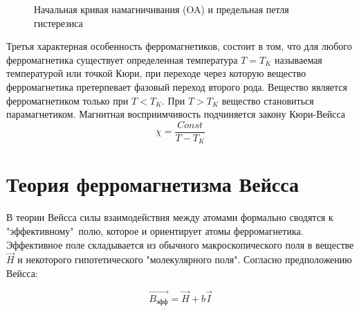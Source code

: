 \documentclass[a4paper,14pt]{article} %
\begin{document}
\begin{figure}[H]
	\caption{Начальная кривая намагничивания (OA) и предельная петля гистерезиса}
\end{figure}

Третья характерная особенность ферромагнетиков, состоит в том, что для любого ферромагнетика существует определенная температура $T = T_K$ называемая температурой или точкой Кюри, при переходе через которую вещество ферромагнетика претерпевает фазовый переход второго рода. Вещество является ферромагнетиком только при $T < T_K$. При $T > T_K$ вещество становиться парамагнетиком. Магнитная восприимчивость подчиняется закону Кюри-Вейсса 
\[\chi = \frac{Const}{T - T_K}\]

\section{Теория ферромагнетизма Вейсса}

В теории Вейсса силы взаимодействия между атомами формально сводятся к "эффективному"\ полю, которое и ориентирует атомы ферромагнетика. Эффективное поле складывается из обычного макроскопического поля в веществе $\overrightarrow{H}$ и некоторого гипотетического "молекулярного поля". Согласно предположению Вейсса:

\[\overrightarrow{B_\text{эфф}} = \overrightarrow{H} + b\overrightarrow{I}\]
\end{document}
